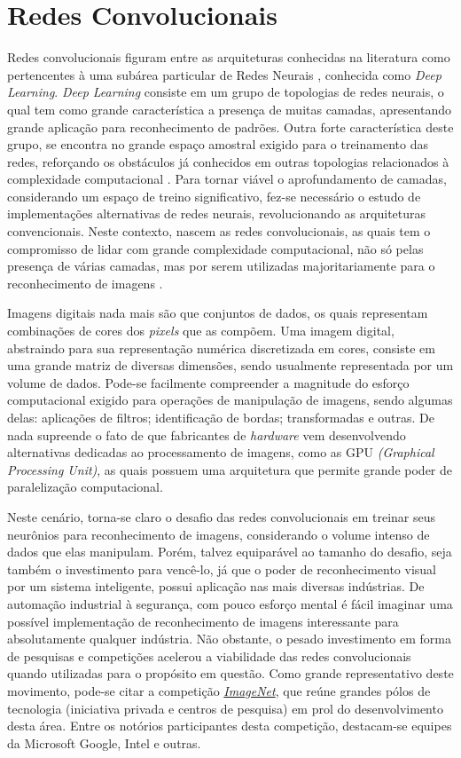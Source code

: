 \documentclass[
	12pt,				%
	oneside,			%
	a4paper,			%
	english,			%
	french,				%
	spanish,			%
	brazil,				%
	]{abntex2}
\begin{document}
\section{Redes Convolucionais}
Redes convolucionais figuram entre as arquiteturas conhecidas na literatura como pertencentes à uma subárea particular de Redes Neurais , conhecida como \textit{Deep Learning}. \textit{Deep Learning} consiste em um grupo  de topologias de redes neurais, o qual tem como grande característica a presença de muitas camadas, apresentando grande aplicação para reconhecimento de padrões. Outra forte característica deste grupo, se encontra no grande espaço amostral exigido para o treinamento das redes, reforçando os obstáculos já conhecidos em outras topologias relacionados à complexidade computacional \cite{ref1}. Para tornar viável o aprofundamento de camadas, considerando um espaço de treino significativo, fez-se necessário o estudo de implementações alternativas de redes neurais, revolucionando as arquiteturas convencionais. Neste contexto, nascem as redes convolucionais, as quais tem o compromisso de lidar com grande complexidade computacional, não só pelas presença de várias camadas, mas por serem utilizadas majoritariamente para o reconhecimento de imagens \cite{ref3}.

Imagens digitais nada mais são que conjuntos de dados, os quais representam combinações de cores dos \textit{pixels} que as compõem. Uma imagem digital, abstraindo para sua representação numérica discretizada em cores, consiste em uma grande matriz de diversas dimensões, sendo usualmente representada por um volume de dados. Pode-se facilmente compreender a magnitude do esforço computacional exigido para operações de manipulação de imagens, sendo algumas delas: aplicações de filtros; identificação de bordas; transformadas e outras. De nada supreende o fato de que fabricantes de \textit{hardware} vem desenvolvendo alternativas dedicadas ao processamento de imagens, como as GPU \textit{(Graphical Processing Unit)}, as quais possuem uma arquitetura que permite grande poder de paralelização computacional.

Neste cenário, torna-se claro o desafio das redes convolucionais em treinar seus neurônios para reconhecimento de imagens, considerando o volume intenso de dados que elas manipulam. Porém, talvez equiparável ao tamanho do desafio, seja também o investimento para vencê-lo, já que o poder de reconhecimento visual por um sistema inteligente, possui aplicação nas mais diversas indústrias. De automação industrial à segurança, com pouco esforço mental é fácil imaginar uma possível implementação de reconhecimento de imagens interessante para absolutamente qualquer indústria. Não obstante, o pesado investimento \cite{ref4} em forma de pesquisas e competições acelerou a viabilidade das redes convolucionais quando utilizadas para o propósito em questão. Como grande representativo deste movimento, pode-se citar a competição \href{http://www.image-net.org/challenges/LSVRC/}{\textit{ImageNet}}, que reúne grandes pólos de tecnologia (iniciativa privada e centros de pesquisa) em prol do desenvolvimento desta área. Entre os notórios participantes desta competição, destacam-se equipes da Microsoft Google, Intel e outras.
\end{document}
